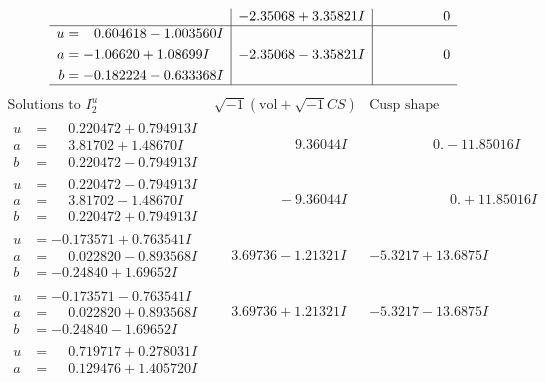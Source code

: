 \documentclass[1p]{elsarticle_modified}
\theoremstyle{definition}
\newcommand{\I}{\sqrt{-1}}
\begin{document}
$$\begin{array}{c|c|c}
 & -2.35068 + 3.35821 I & \phantom{-0.000000 } 0 \\ \hline\begin{aligned}
u &= \phantom{-}0.604618 - 1.003560 I \\
a &= -1.06620 + 1.08699 I \\
b &= -0.182224 - 0.633368 I\end{aligned}
 & -2.35068 - 3.35821 I & \phantom{-0.000000 } 0\\
 \hline 
 \end{array}$$\newpage$$\begin{array}{c|c|c}  
\text{Solutions to }I^u_{2}& \I (\text{vol} + \sqrt{-1}CS) & \text{Cusp shape}\\
 \hline 
\begin{aligned}
u &= \phantom{-}0.220472 + 0.794913 I \\
a &= \phantom{-}3.81702 + 1.48670 I \\
b &= \phantom{-}0.220472 - 0.794913 I\end{aligned}
 & \phantom{-0.000000 -}9.36044 I & \phantom{-0.000000 } 0. - 11.85016 I \\ \hline\begin{aligned}
u &= \phantom{-}0.220472 - 0.794913 I \\
a &= \phantom{-}3.81702 - 1.48670 I \\
b &= \phantom{-}0.220472 + 0.794913 I\end{aligned}
 & \phantom{-0.000000 } -9.36044 I & \phantom{-0.000000 -}0. + 11.85016 I \\ \hline\begin{aligned}
u &= -0.173571 + 0.763541 I \\
a &= \phantom{-}0.022820 - 0.893568 I \\
b &= -0.24840 + 1.69652 I\end{aligned}
 & \phantom{-}3.69736 - 1.21321 I & -5.3217 + 13.6875 I \\ \hline\begin{aligned}
u &= -0.173571 - 0.763541 I \\
a &= \phantom{-}0.022820 + 0.893568 I \\
b &= -0.24840 - 1.69652 I\end{aligned}
 & \phantom{-}3.69736 + 1.21321 I & -5.3217 - 13.6875 I \\ \hline\begin{aligned}
u &= \phantom{-}0.719717 + 0.278031 I \\
a &= \phantom{-}0.129476 + 1.405720 I \\

\end{aligned}
\end{array}$$
\end{document}
